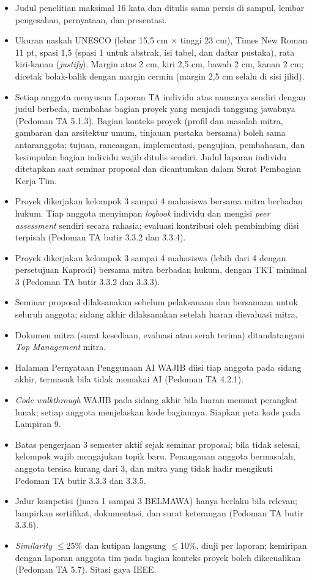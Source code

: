 \begin{itemize}
	\item Judul penelitian maksimal 16 kata dan ditulis sama persis di sampul, lembar pengesahan, pernyataan, dan presentasi.
	\item Ukuran naskah UNESCO (lebar 15,5 cm $\times$ tinggi 23 cm), Times New Roman 11 pt, spasi 1,5 (spasi 1 untuk abstrak, isi tabel, dan daftar pustaka), rata kiri-kanan (\textit{justify}). Margin atas 2 cm, kiri 2,5 cm, bawah 2 cm, kanan 2 cm; dicetak bolak-balik dengan margin cermin (margin 2,5 cm selalu di sisi jilid).
	\item Setiap anggota menyusun Laporan TA individu atas namanya sendiri dengan judul berbeda, membahas bagian proyek yang menjadi tanggung jawabnya (Pedoman TA 5.1.3). Bagian konteks proyek (profil dan masalah mitra, gambaran dan arsitektur umum, tinjauan pustaka bersama) boleh sama antaranggota; tujuan, rancangan, implementasi, pengujian, pembahasan, dan kesimpulan bagian individu wajib ditulis sendiri. Judul laporan individu ditetapkan saat seminar proposal dan dicantumkan dalam Surat Pembagian Kerja Tim.
	\item Proyek dikerjakan kelompok 3 sampai 4 mahasiswa bersama mitra berbadan hukum. Tiap anggota menyimpan \textit{logbook} individu dan mengisi \textit{peer assessment} sendiri secara rahasia; evaluasi kontribusi oleh pembimbing diisi terpisah (Pedoman TA butir 3.3.2 dan 3.3.4).
	\item Proyek dikerjakan kelompok 3 sampai 4 mahasiswa (lebih dari 4 dengan persetujuan Kaprodi) bersama mitra berbadan hukum, dengan TKT minimal 3 (Pedoman TA butir 3.3.2 dan 3.3.3).
	\item Seminar proposal dilaksanakan sebelum pelaksanaan dan bersamaan untuk seluruh anggota; sidang akhir dilaksanakan setelah luaran dievaluasi mitra.
	\item Dokumen mitra (surat kesediaan, evaluasi atau serah terima) ditandatangani \textit{Top Management} mitra.
	\item Halaman Pernyataan Penggunaan AI WAJIB diisi tiap anggota pada sidang akhir, termasuk bila tidak memakai AI (Pedoman TA 4.2.1).
	\item \textit{Code walkthrough} WAJIB pada sidang akhir bila luaran memuat perangkat lunak; setiap anggota menjelaskan kode bagiannya. Siapkan peta kode pada Lampiran 9.
	\item Batas pengerjaan 3 semester aktif sejak seminar proposal; bila tidak selesai, kelompok wajib mengajukan topik baru. Penanganan anggota bermasalah, anggota tersisa kurang dari 3, dan mitra yang tidak hadir mengikuti Pedoman TA butir 3.3.3 dan 3.3.5.
	\item Jalur kompetisi (juara 1 sampai 3 BELMAWA) hanya berlaku bila relevan; lampirkan sertifikat, dokumentasi, dan surat keterangan (Pedoman TA butir 3.3.6).
	\item \textit{Similarity} $\leq$25\% dan kutipan langsung $\leq$10\%, diuji per laporan; kemiripan dengan laporan anggota tim pada bagian konteks proyek boleh dikecualikan (Pedoman TA 5.7). Sitasi gaya IEEE.
\end{itemize}

